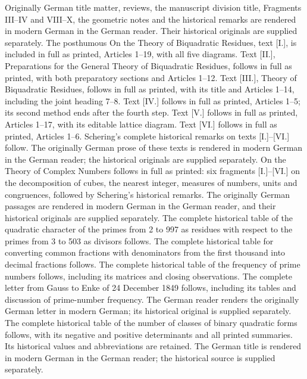 \begin{titlepage}
\begin{minipage}{0.90\linewidth}
\end{minipage}\clearpage\thispagestyle{empty}
\begin{minipage}{0.98\linewidth}\small
Originally German title matter, reviews, the manuscript division title, Fragments III–IV and VIII–X, the geometric notes and the historical remarks are rendered in modern German in the German reader. Their historical originals are supplied separately. The posthumous On the Theory of Biquadratic Residues, text [I.], is included in full as printed, Articles 1–19, with all five diagrams. Text [II.], Preparations for the General Theory of Biquadratic Residues, follows in full as printed, with both preparatory sections and Articles 1–12. Text [III.], Theory of Biquadratic Residues, follows in full as printed, with its title and Articles 1–14, including the joint heading 7–8. Text [IV.] follows in full as printed, Articles 1–5; its second method ends after the fourth step. Text [V.] follows in full as printed, Articles 1–17, with its editable lattice diagram. Text [VI.] follows in full as printed, Articles 1–6. Schering’s complete historical remarks on texts [I.]–[VI.] follow. The originally German prose of these texts is rendered in modern German in the German reader; the historical originals are supplied separately. On the Theory of Complex Numbers follows in full as printed: six fragments [I.]–[VI.] on the decomposition of cubes, the nearest integer, measures of numbers, units and congruences, followed by Schering’s historical remarks. The originally German passages are rendered in modern German in the German reader, and their historical originals are supplied separately. The complete historical table of the quadratic character of the primes from 2 to 997 as residues with respect to the primes from 3 to 503 as divisors follows. The complete historical table for converting common fractions with denominators from the first thousand into decimal fractions follows. The complete historical table of the frequency of prime numbers follows, including its matrices and closing observations. The complete letter from Gauss to Enke of 24 December 1849 follows, including its tables and discussion of prime-number frequency. The German reader renders the originally German letter in modern German; its historical original is supplied separately. The complete historical table of the number of classes of binary quadratic forms follows, with its negative and positive determinants and all printed summaries. Its historical values and abbreviations are retained. The German title is rendered in modern German in the German reader; the historical source is supplied separately. \end{minipage}\clearpage\thispagestyle{empty}

\end{titlepage}
